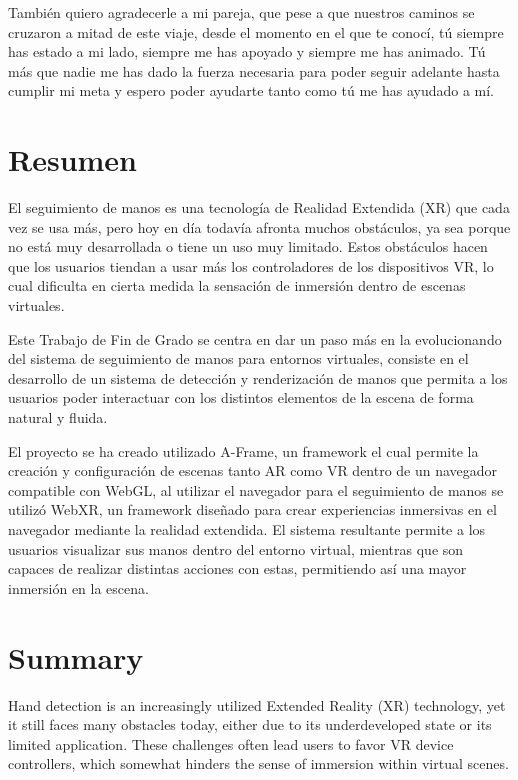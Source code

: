 \documentclass[a4paper, 12pt]{book}
\begin{document}
También quiero agradecerle a mi pareja, que pese a que nuestros caminos se cruzaron a mitad de este viaje, desde el momento en el que te conocí, tú siempre has estado a mi lado, siempre me has apoyado y siempre me has animado. Tú más que nadie me has dado la fuerza necesaria para poder seguir adelante hasta cumplir mi meta y espero poder ayudarte tanto como tú me has ayudado a mí. 


\chapter*{Resumen}
El seguimiento de manos es una tecnología de Realidad Extendida (XR) que cada vez se usa más, pero hoy en día todavía afronta muchos obstáculos, ya sea porque no está muy desarrollada o tiene un uso muy limitado. Estos obstáculos hacen que los usuarios tiendan a usar más los controladores de los dispositivos VR, lo cual dificulta en cierta medida la sensación de inmersión dentro de escenas virtuales. 

Este Trabajo de Fin de Grado se centra en dar un paso más en la evolucionando del sistema de seguimiento de manos para entornos virtuales, consiste en el desarrollo de un sistema de detección y renderización de manos que permita a los usuarios 
poder interactuar con los distintos elementos de la escena de forma natural y fluida.

El proyecto se ha creado utilizado A-Frame, un framework el cual permite la creación y configuración de escenas tanto AR como VR dentro de un navegador compatible con WebGL, al utilizar el navegador para el seguimiento de manos se utilizó WebXR, un framework diseñado para crear experiencias inmersivas en el navegador mediante la realidad extendida. El sistema resultante permite a los usuarios visualizar sus manos dentro del entorno virtual, mientras que son capaces de realizar distintas acciones con estas, permitiendo así una mayor inmersión en la escena.


\chapter*{Summary}
Hand detection is an increasingly utilized Extended Reality (XR) technology, yet it still faces many obstacles today, either due to its underdeveloped state or its limited application. These challenges often lead users to favor VR device controllers, which somewhat hinders the sense of immersion within virtual scenes.
\end{document}
